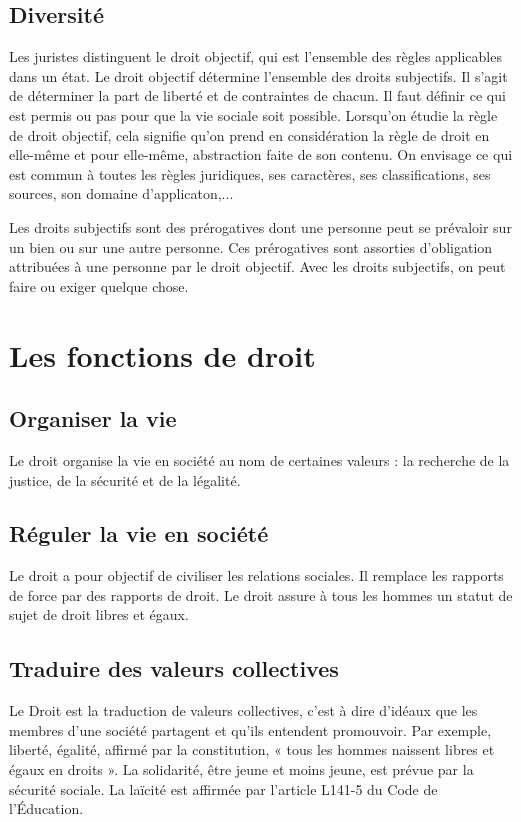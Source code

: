 \documentclass[11pt]{article}
\begin{document}
		\subsection{Diversité}
			Les juristes distinguent le droit objectif, qui est l'ensemble des règles applicables dans un état. Le droit objectif détermine l'ensemble des droits subjectifs. Il s'agit de déterminer la part de liberté et de contraintes de chacun. Il faut définir ce qui est permis ou pas pour que la vie sociale soit possible. Lorsqu'on étudie la règle de droit objectif, cela signifie qu'on prend en considération la règle de droit en elle-même et pour elle-même, abstraction faite de son contenu. On envisage ce qui est commun à toutes les règles juridiques, ses caractères, ses classifications, ses sources, son domaine d'applicaton,...
			
			Les droits subjectifs sont des prérogatives dont une personne peut se prévaloir sur un bien ou sur une autre personne. Ces prérogatives sont assorties d'obligation attribuées à une personne par le droit objectif. Avec les droits subjectifs, on peut faire ou exiger quelque chose.
			
	\section{Les fonctions de droit}
		\subsection{Organiser la vie}
			Le droit organise la vie en société au nom de certaines valeurs : la recherche de la justice, de la sécurité et de la légalité.
			
		\subsection{Réguler la vie en société}
			Le droit a pour objectif de civiliser les relations sociales. Il remplace les rapports de force par des rapports de droit. Le droit assure à tous les hommes un statut de sujet de droit libres et égaux.
			
		\subsection{Traduire des valeurs collectives}
			Le Droit est la traduction de valeurs collectives, c'est à dire d'idéaux que les membres d'une société partagent et qu'ils entendent promouvoir. Par exemple, liberté, égalité, affirmé par la constitution, « tous les hommes naissent libres et égaux en droits ». La solidarité, être jeune et moins jeune, est prévue par la sécurité sociale. La laïcité est affirmée par l'article L141-5 du Code de l'Éducation.
			
\end{document}
